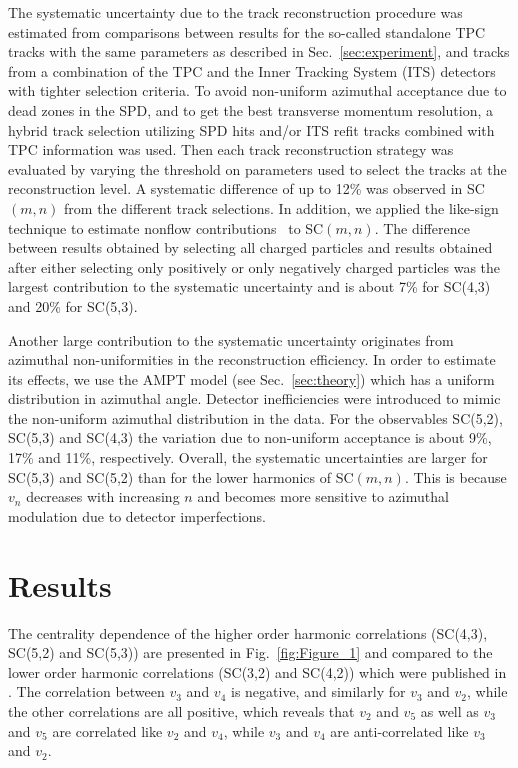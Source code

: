 The systematic uncertainty due to the track reconstruction procedure was estimated from comparisons between results for the so-called standalone TPC tracks with the 
same parameters as described in Sec.~\ref{sec:experiment}, and tracks from a combination of the TPC and the Inner Tracking System (ITS) detectors with tighter selection criteria.
To avoid non-uniform azimuthal acceptance due to dead zones in the SPD, and to get the best transverse momentum resolution, a hybrid track selection utilizing SPD hits and/or ITS refit tracks combined with TPC information was used.
Then each track reconstruction strategy was evaluated by varying the threshold on parameters used to select the tracks at the reconstruction level. 
A systematic difference of up to 12\% was observed in SC$(m,n)$ from the different track selections. 
In addition, we applied the like-sign technique to estimate nonflow contributions~\cite{Aamodt:2010pa} to SC$(m,n)$. The difference between results obtained by selecting all charged particles and results obtained after either selecting only positively or only negatively charged particles was the largest contribution to the systematic uncertainty and is about 7\% for SC(4,3) and 20\% for SC(5,3). 

Another large contribution to the systematic uncertainty originates from azimuthal non-uniformities in the reconstruction efficiency. In order to estimate its effects, we use the AMPT model (see Sec.~\ref{sec:theory}) which has a uniform distribution in azimuthal angle.
Detector inefficiencies were introduced to mimic the non-uniform azimuthal distribution in the data. For the observables SC(5,2), SC(5,3) and SC(4,3) the variation due to non-uniform acceptance is about 9\%, 17\% and 11\%, respectively.
Overall, the systematic uncertainties are larger for SC(5,3) and SC(5,2) than for the lower harmonics of SC$(m,n)$.
This is because $v_{n}$ decreases with increasing $n$ and becomes more sensitive to azimuthal modulation due to detector imperfections. 

\section{Results}
\label{sec:results}
The centrality dependence of the higher order harmonic correlations (SC(4,3), SC(5,2) and SC(5,3)) are presented in Fig.~\ref{fig:Figure_1} and compared to the lower order harmonic correlations (SC(3,2) and SC(4,2)) which were published in \cite{ALICE:2016kpq}. The correlation between $v_3$ and $v_4$ is negative, and similarly for $v_3$ and $v_2$, while the other correlations are all positive, which reveals that $v_2$ and $v_5$ as well as $v_3$ and $v_5$ are correlated like $v_2$ and $v_4$, while $v_3$ and $v_4$ are anti-correlated like $v_3$ and $v_2$.

